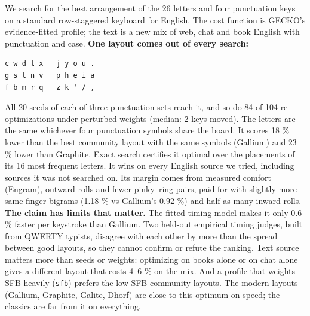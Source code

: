 \documentclass{gecko-paper}
\begin{document}
\makepapertitle
\begin{paperabstract}
We search for the best arrangement of the 26 letters and four punctuation keys on a standard row-staggered keyboard for English. The cost function is GECKO's evidence-fitted profile; the text is a new mix of web, chat and book English with punctuation and case. \textbf{One layout comes out of every search:}

\begin{verbatim}
c w d l x   j y o u .
g s t n v   p h e i a
f b m r q   z k ' / ,
\end{verbatim}

All 20 seeds of each of three punctuation sets reach it, and so do 84 of 104 re-optimizations under perturbed weights (median: 2 keys moved). The letters are the same whichever four punctuation symbols share the board. It scores 18 \% lower than the best community layout with the same symbols (Gallium) and 23 \% lower than Graphite. Exact search certifies it optimal over the placements of its 16
most frequent letters. It wins on every English source we tried, including sources it was not searched on. Its margin comes from measured comfort (Engram), outward rolls and fewer pinky–ring pairs, paid for with slightly more same-finger bigrams (1.18 \% vs Gallium's 0.92 \%) and half as many inward rolls. \textbf{The claim has limits that matter.} The fitted timing model makes it only 0.6 \%
faster per keystroke than Gallium. Two held-out empirical timing judges, built from QWERTY typists, disagree with each other by more than the spread between good layouts, so they cannot confirm or refute the ranking. Text source matters more than seeds or weights: optimizing on books alone or on chat alone gives a different layout that costs 4–6 \% on the mix. And a profile that weights SFB
heavily (\texttt{sfb}) prefers the low-SFB community layouts. The modern layouts (Gallium, Graphite, Galite, Dhorf) are close to this optimum on speed; the classics are far from it on everything.

\end{paperabstract}
\raggedright
\end{document}
